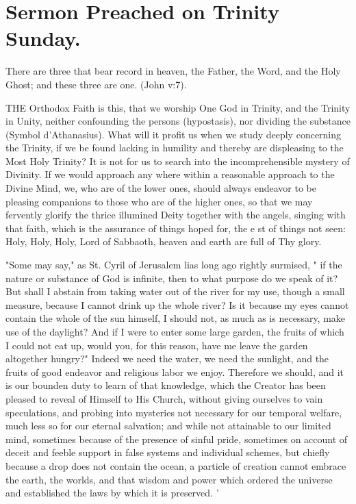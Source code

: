 \chapter{Sermon Preached on Trinity Sunday.}

There are three that bear record in heaven, the Father, 
the Word, and the Holy Ghost; and these three are one. 
(John v:7). 

THE Orthodox Faith is this, that we worship 
One God in Trinity, and the Trinity in 
Unity, neither confounding the persons (hypostasis),
nor dividing the substance (Symbol 
d'Athanasius). What will it profit us when we 
study deeply concerning the Trinity, if we be 
found lacking in humility and thereby are displeasing
to the Most Holy Trinity? It is not 
for us to search into the incomprehensible mystery
of Divinity. If we would approach any 
where within a reasonable approach to the Divine 
Mind, we, who are of the lower ones, should 
always endeavor to be pleasing companions to 
those who are of the higher ones, so that we may 
fervently glorify the thrice illumined Deity together
with the angels, singing with that faith, 
which is the assurance of things hoped for, the 
e st of things not seen: Holy, Holy, Holy, Lord
of Sabbaoth, heaven and earth are full of Thy 
glory. 

"Some may say," as St. Cyril of Jerusalem 
lias long ago rightly surmised, " if the nature or 
substance of God is infinite, then to what purpose
do we speak of it? But shall I abstain 
from taking water out of the river for my use, 
though a small measure, because I cannot drink 
up the whole river? Is it because my eyes cannot
contain the whole of the sun himself, I should 
not, as much as is necessary, make use of the 
daylight? And if I were to enter some large 
garden, the fruits of which I could not eat up, 
would you, for this reason, have me leave the 
garden altogether hungry?" Indeed we need 
the water, we need the sunlight, and the fruits 
of good endeavor and religious labor we enjoy. 
Therefore we should, and it is our bounden duty 
to learn of that knowledge, which the Creator 
has been pleased to reveal of Himself to His 
Church, without giving ourselves to vain speculations,
and probing into mysteries not necessary
for our temporal welfare, much less so for 
our eternal salvation; and while not attainable 
to our limited mind, sometimes because of the 
presence of sinful pride, sometimes on account 
of deceit and feeble support in false systems
and individual schemes, but chiefly because a 
drop does not contain the ocean, a particle of 
creation cannot embrace the earth, the worlds, 
and that wisdom and power which ordered the 
universe and established the laws by which it is 
preserved. ' 

